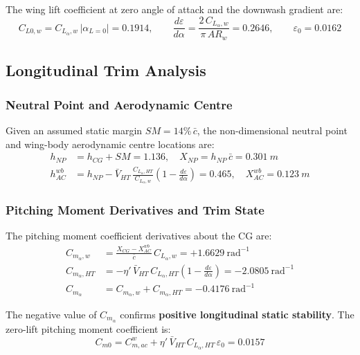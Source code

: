 The wing lift coefficient at zero angle of attack and the downwash gradient are:
\begin{equation}
  C_{L0,w} = C_{L_\alpha,w}\,\left|\alpha_{L=0}\right| = 0.1914, \qquad
  \frac{d\varepsilon}{d\alpha} = \frac{2\,C_{L_\alpha,w}}{\pi\,AR_w} = 0.2646, \qquad
  \varepsilon_0 = 0.0162
  \label{eq:downwash}
\end{equation}

\subsection{Longitudinal Trim Analysis}
\label{subsec:trim}

\subsubsection{Neutral Point and Aerodynamic Centre}

Given an assumed static margin $SM = 14\%\,\bar{c}$, the non-dimensional neutral point and wing-body aerodynamic centre locations are:
\begin{align}
  h_{NP} &= h_{CG} + SM = 1.136, \quad X_{NP} = h_{NP}\,\bar{c} = \SI{0.301}{m} \\[4pt]
  h_{AC}^{wb} &= h_{NP} - \bar{V}_{HT}\,\frac{C_{L_\alpha,HT}}{C_{L_\alpha,w}}\left(1-\frac{d\varepsilon}{d\alpha}\right) = 0.465, \quad X_{AC}^{wb} = \SI{0.123}{m}
\end{align}

\subsubsection{Pitching Moment Derivatives and Trim State}

The pitching moment coefficient derivatives about the CG are:
\begin{align}
  C_{m_\alpha,w}  &= \frac{X_{CG}-X_{AC}^{wb}}{\bar{c}}\,C_{L_\alpha,w} = +1.6629~\text{rad}^{-1} \\[4pt]
  C_{m_\alpha,HT} &= -\eta'\,\bar{V}_{HT}\,C_{L_\alpha,HT}\!\left(1-\frac{d\varepsilon}{d\alpha}\right) = -2.0805~\text{rad}^{-1} \\[4pt]
  C_{m_\alpha}    &= C_{m_\alpha,w} + C_{m_\alpha,HT} = \mathbf{-0.4176}~\text{rad}^{-1}
\end{align}

The negative value of $C_{m_\alpha}$ confirms \textbf{positive longitudinal static stability}. The zero-lift pitching moment coefficient is:
\begin{equation}
  C_{m0} = C_{m,ac}^{w} + \eta'\,\bar{V}_{HT}\,C_{L_\alpha,HT}\,\varepsilon_0 = 0.0157
\end{equation}

